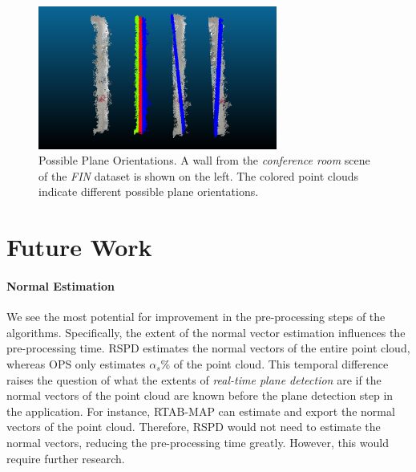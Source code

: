 \documentclass[main.tex]{subfiles}
\begin{document}
\begin{figure}
    \centering
    \includegraphics[width=0.7\textwidth]{images/possible_planes.png}
    \caption[Possible Plane Orientations]{Possible Plane Orientations. A wall from the \textit{conference room} scene of the \textit{FIN} dataset is shown on the left. The colored point clouds indicate different possible plane orientations.}
    \label{fig:poss-planes}
\end{figure}

\section{Future Work}

\paragraph{Normal Estimation}
We see the most potential for improvement in the pre-processing steps of the algorithms. Specifically, the extent of the normal vector estimation influences the pre-processing time. RSPD estimates the normal vectors of the entire point cloud, whereas OPS only estimates $\alpha_s$\% of the point cloud. This temporal difference raises the question of what the extents of \textit{real-time plane detection} are if the normal vectors of the point cloud are known before the plane detection step in the application. For instance, RTAB-MAP can estimate and export the normal vectors of the point cloud. Therefore, RSPD would not need to estimate the normal vectors, reducing the pre-processing time greatly. However, this would require further research.
\end{document}
